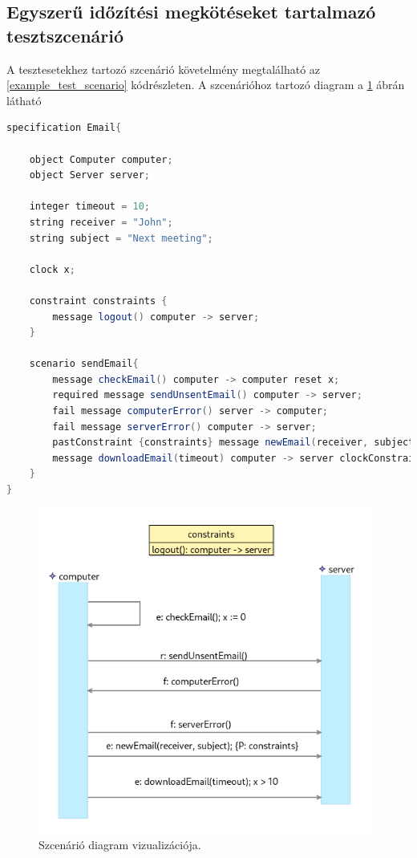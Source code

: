 \subsection{Egyszerű időzítési megkötéseket tartalmazó tesztszcenárió}

A tesztesetekhez tartozó szcenárió követelmény megtalálható az \ref{example_test_scenario} kódrészleten.
A szcenárióhoz tartozó diagram a \ref{example_test_scenario_diagram} ábrán látható

\begin{lstlisting}[language=java, frame=single, float=ht!, caption={Tesztesethez tartozó szcenárió szöveges leírása.},captionpos=b,label=example_test_scenario]
specification Email{

    object Computer computer;
    object Server server;

    integer timeout = 10;
    string receiver = "John";
    string subject = "Next meeting";

    clock x;

    constraint constraints {
        message logout() computer -> server;
    }

    scenario sendEmail{
        message checkEmail() computer -> computer reset x;
        required message sendUnsentEmail() computer -> server;
        fail message computerError() server -> computer;
        fail message serverError() computer -> server;
        pastConstraint {constraints} message newEmail(receiver, subject) computer -> server;
        message downloadEmail(timeout) computer -> server clockConstraint {>(x,10)};
    }
}
\end{lstlisting}

\begin{figure}[!ht]
    \centering
    \includegraphics[width=110mm, keepaspectratio]{figures/diagramExample.png}
    \caption{Szcenárió diagram vizualizációja.}
    \label{example_test_scenario_diagram}
\end{figure}

